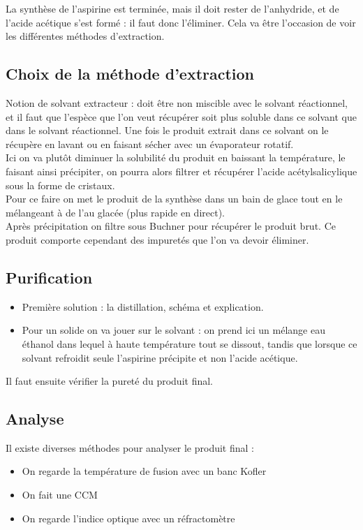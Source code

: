 \documentclass[12pt,prb,aps,epsf]{article}
\begin{document}
La synthèse de l'aspirine est terminée, mais il doit rester de l'anhydride, et de l'acide acétique s'est formé : il faut donc l'éliminer. Cela va être l'occasion de voir les différentes méthodes d'extraction.

\subsection{Choix de la méthode d'extraction}
Notion de solvant extracteur : doit être non miscible avec le solvant réactionnel, et il faut que l'espèce que l'on veut récupérer soit plus soluble dans ce solvant que dans le solvant réactionnel. Une fois le produit extrait dans ce solvant on le récupère en lavant ou en faisant sécher avec un évaporateur rotatif.\\

Ici on va plutôt diminuer la solubilité du produit en baissant la température, le faisant ainsi précipiter, on pourra alors filtrer et récupérer l'acide acétylsalicylique sous la forme  de cristaux. \\
Pour ce faire on met le produit de la synthèse dans un bain de glace tout en le mélangeant à de l'au glacée (plus rapide en direct).\\

Après précipitation on filtre sous Buchner pour récupérer le produit brut. Ce produit comporte cependant des impuretés que l'on va devoir éliminer.

\subsection{Purification}
\begin{itemize}
	\item Première solution : la distillation, schéma et explication.
	\item Pour un solide on va jouer sur le solvant : on prend ici un mélange eau éthanol dans lequel à haute température tout se dissout, tandis que lorsque ce solvant refroidit seule l'aspirine précipite et non l'acide acétique.
\end{itemize}
Il faut ensuite vérifier la pureté du produit final.

\subsection{Analyse}
Il existe diverses méthodes pour analyser le produit final :
\begin{itemize}
	\item On regarde la température de fusion avec un banc Kofler
	\item On fait une CCM
	\item On regarde l'indice optique avec un réfractomètre
\end{itemize}
\end{document}
